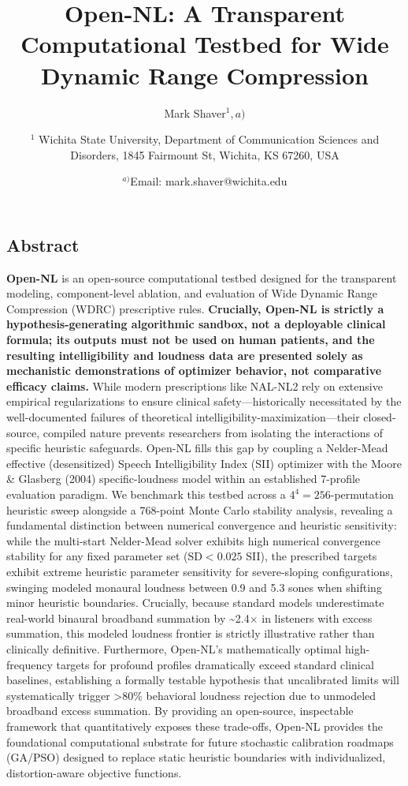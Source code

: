\documentclass[
  12pt,
]{article}
\title{Open-NL: A Transparent Computational Testbed for Wide Dynamic
Range Compression}
\author{Mark
Shaver\(^1,a)\) \and \parbox{\textwidth}{\centering $^1$ Wichita State University, Department of Communication Sciences and Disorders, 1845 Fairmount St, Wichita, KS 67260, USA} \and \(^{a)}\)Email:
mark.shaver@wichita.edu}
\date{}
\begin{document}
\maketitle

\linenumbers

\subsection{Abstract}\label{abstract}

\textbf{Open-NL} is an open-source computational testbed designed for
the transparent modeling, component-level ablation, and evaluation of
Wide Dynamic Range Compression (WDRC) prescriptive rules.
\textbf{Crucially, Open-NL is strictly a hypothesis-generating
algorithmic sandbox, not a deployable clinical formula; its outputs must
not be used on human patients, and the resulting intelligibility and
loudness data are presented solely as mechanistic demonstrations of
optimizer behavior, not comparative efficacy claims.} While modern
prescriptions like NAL-NL2 rely on extensive empirical regularizations
to ensure clinical safety---historically necessitated by the
well-documented failures of theoretical
intelligibility-maximization---their closed-source, compiled nature
prevents researchers from isolating the interactions of specific
heuristic safeguards. Open-NL fills this gap by coupling a Nelder-Mead
effective (desensitized) Speech Intelligibility Index (SII) optimizer
with the Moore \& Glasberg (2004) specific-loudness model within an
established 7-profile evaluation paradigm. We benchmark this testbed
across a \(4^4 = 256\)-permutation heuristic sweep alongside a 768-point
Monte Carlo stability analysis, revealing a fundamental distinction
between numerical convergence and heuristic sensitivity: while the
multi-start Nelder-Mead solver exhibits high numerical convergence
stability for any fixed parameter set (\(\text{SD} < 0.025\) SII), the
prescribed targets exhibit extreme heuristic parameter sensitivity for
severe-sloping configurations, swinging modeled monaural loudness
between 0.9 and 5.3 sones when shifting minor heuristic boundaries.
Crucially, because standard models underestimate real-world binaural
broadband summation by \textasciitilde2.4\(\times\) in listeners with
excess summation, this modeled loudness frontier is strictly
illustrative rather than clinically definitive. Furthermore, Open-NL's
mathematically optimal high-frequency targets for profound profiles
dramatically exceed standard clinical baselines, establishing a formally
testable hypothesis that uncalibrated limits will systematically trigger
\textgreater80\% behavioral loudness rejection due to unmodeled
broadband excess summation. By providing an open-source, inspectable
framework that quantitatively exposes these trade-offs, Open-NL provides
the foundational computational substrate for future stochastic
calibration roadmaps (GA/PSO) designed to replace static heuristic
boundaries with individualized, distortion-aware objective functions.
\end{document}
